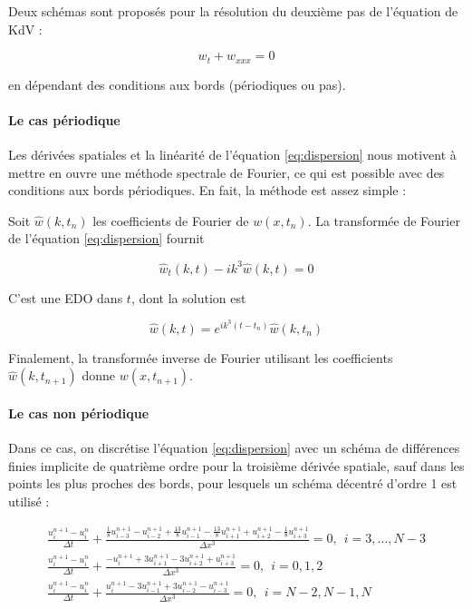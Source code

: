 \indent Deux schémas sont proposés pour la résolution du deuxième pas de l'équation de KdV :

\begin{equation}
	\label{eq:dispersion}
	w_t + w_{xxx} = 0
\end{equation}

\noindent en dépendant des conditions aux bords (périodiques ou pas).

\paragraph{Le cas périodique}

\indent Les dérivées spatiales et la linéarité de l'équation \eqref{eq:dispersion} nous motivent à mettre en ouvre une méthode spectrale de Fourier, ce qui est possible avec des conditions aux bords périodiques. En fait, la méthode est assez simple :

\indent Soit $\hat{w}(k,t_n)$  les coefficients de Fourier de $w(x,t_n)$. La transformée de Fourier de l'équation \eqref{eq:dispersion} fournit

\begin{equation*}
	\hat{w}_t(k,t) - ik^3\hat{w}(k,t) = 0
\end{equation*}

\indent C'est une EDO dans $t$, dont la solution est

\begin{equation*}
\hat{w}(k,t) = e^{ik^3(t-t_n)}\hat{w}(k,t_n)
\end{equation*}

\indent Finalement, la transformée inverse de Fourier utilisant les coefficients $\hat{w}(k,t_{n+1})$ donne $w(x,t_{n+1})$.

\paragraph{Le cas non périodique}

\indent Dans ce cas, on discrétise l'équation \eqref{eq:dispersion} avec un schéma de différences finies implicite de quatrième ordre pour la troisième dérivée spatiale, sauf dans les points les plus proches des bords, pour lesquels un schéma décentré  d'ordre 1 est utilisé :

\begin{equation*}
\begin{gathered}
	\frac{u_i^{n+1} - u_i^n}{\Delta t} + \frac{\frac{1}{8}u_{i-3}^{n+1} - u_{i-2}^{n+1}  + \frac{13}{8}u_{i-1}^{n+1} - \frac{13}{8}u_{i+1}^{n+1} + u_{i+2}^{n+1} - \frac{1}{8}u_{i+3}^{n+1}}{\Delta x^3} = 0, \ \ i = 3,...,N-3 \\
	\frac{u_i^{n+1} - u_i^n}{\Delta t}  + \frac{-u_{i}^{n+1} + 3u_{i+1}^{n+1}  -3 u_{i+2}^{n+1} + u_{i+3}^{n+1} }{\Delta x^3} = 0, \ \ i = 0,1,2 \\
	\frac{u_i^{n+1} - u_i^n}{\Delta t}  + \frac{u_{i}^{n+1} - 3u_{i-1}^{n+1}  + 3 u_{i-2}^{n+1} - u_{i-3}^{n+1} }{\Delta x^3} = 0, \ \ i = N-2,N-1,N 
\end{gathered} 
\end{equation*}

